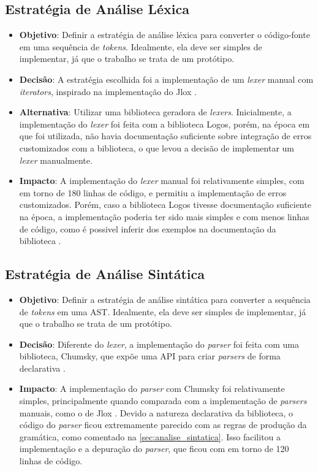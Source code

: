 \subsection{Estratégia de Análise Léxica}

\begin{itemize}
	\item \textbf{Objetivo}: Definir a estratégia de análise léxica para converter o código-fonte em uma sequência de \textit{tokens}. Idealmente, ela deve ser simples de implementar, já que o trabalho se trata de um protótipo.
	\item \textbf{Decisão}: A estratégia escolhida foi a implementação de um \textit{lexer} manual com \textit{iterators}, inspirado na implementação do Jlox \cite{craftinginterpreters}.
	\item \textbf{Alternativa}: Utilizar uma biblioteca geradora de \textit{lexers}. Inicialmente, a implementação do \textit{lexer} foi feita com a biblioteca Logos, porém, na época em que foi utilizada, não havia documentação suficiente sobre integração de erros customizados com a biblioteca, o que levou a decisão de implementar um \textit{lexer} manualmente.
	\item \textbf{Impacto}: A implementação do \textit{lexer} manual foi relativamente simples, com em torno de 180 linhas de código, e permitiu a implementação de erros customizados. Porém, caso a biblioteca Logos tivesse documentação suficiente na época, a implementação poderia ter sido mais simples e com menos linhas de código, como é possivel inferir dos exemplos na documentação da biblioteca \cite{logos}.
\end{itemize}

\subsection{Estratégia de Análise Sintática}

\begin{itemize}
	\item \textbf{Objetivo}: Definir a estratégia de análise sintática para converter a sequência de \textit{tokens} em uma AST. Idealmente, ela deve ser simples de implementar, já que o trabalho se trata de um protótipo.
	\item \textbf{Decisão}: Diferente do \textit{lexer}, a implementação do \textit{parser} foi feita com uma biblioteca, Chumsky, que expõe uma API para criar \textit{parsers} de forma declarativa \cite{chumsky}.
	\item \textbf{Impacto}: A implementação do \textit{parser} com Chumsky foi relativamente simples, principalmente quando comparada com a implementação de \textit{parsers} manuais, como o de Jlox \cite{craftinginterpreters}. Devido a natureza declarativa da biblioteca, o código do \textit{parser} ficou extremamente parecido com as regras de produção da gramática, como comentado na \autoref{sec:analise_sintatica}. Isso facilitou a implementação e a depuração do \textit{parser}, que ficou com em torno de 120 linhas de código.
\end{itemize}

